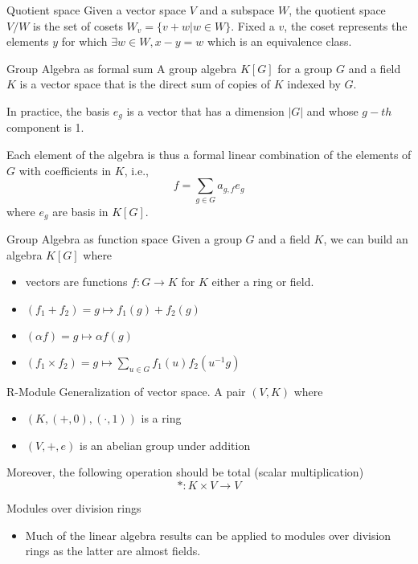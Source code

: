 \documentclass[presentation]{beamer}
\begin{document}
\begin{frame}[label={sec:org261e562}]{Quotient space}
Given a vector space \(V\) and a subspace \(W\), the quotient space \(V/W\) is the set of
cosets \(W_v = \{ v + w | w \in W \}\).  Fixed a \(v\), the coset represents the elements \(y\)
for which \(\exists w \in W, x - y = w\) which is an equivalence class.
\end{frame}

\begin{frame}[label={sec:orgfa80986}]{Group Algebra as formal sum}
A group algebra \(K[G]\) for a group \(G\) and a field \(K\) is a vector space
that is the direct sum of copies of \(K\) indexed by \(G\).

In practice, the basis \(e_g\) is a vector that has a dimension \(|G|\) and
whose \(g-th\) component is 1.

Each element of the algebra is thus a formal linear combination of the
elements of \(G\) with coefficients in \(K\), i.e., $$f = \sum_{g\in G}a_{g,f}
    e_g$$ where \(e_g\) are basis in \(K[G]\).
\end{frame}


\begin{frame}[label={sec:org860b1bb}]{Group Algebra as function space}
Given a group \(G\) and a field \(K\), we can build an algebra \(K[G]\) where

\begin{itemize}
\item vectors are functions \(f: G \rightarrow K\) for \(K\) either a ring or
field.
\item \((f_1 + f_2) = g \mapsto f_1(g) + f_2(g)\)
\item \((\alpha f) = g \mapsto \alpha f(g)\)
\item \((f_1 \times f_2) = g \mapsto \sum_{u \in G}f_1(u)f_2(u^{-1}g)\)
\end{itemize}
\end{frame}



\begin{frame}[label={sec:org39c37a8}]{R-Module}
Generalization of vector space. A pair \((V,K)\) where

\begin{itemize}
\item \((K,(+ ,0),(\cdot,1))\) is a \alert{ring}
\item \((V,+,e)\) is an abelian group under addition
\end{itemize}

Moreover, the following operation should be total (scalar multiplication)
\[
    *: K \times V \rightarrow V
    \]
\end{frame}
\begin{frame}[label={sec:orge86ef2b}]{Modules over division rings}
\begin{itemize}
\item Much of the linear algebra results can be applied to modules over division
rings as the latter are almost fields.
\end{itemize}
\end{frame}
\end{document}
